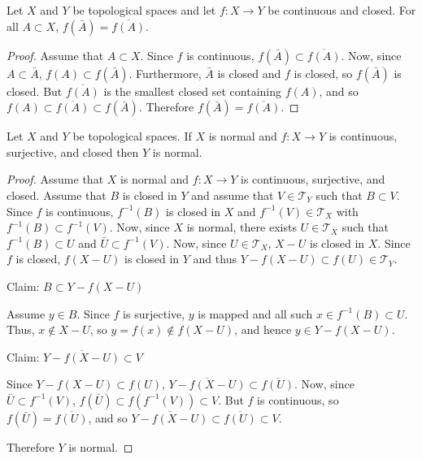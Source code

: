 \documentclass[letterpaper,12pt,fleqn]{article}
\newcommand{\T}{\mathscr{T}}
\begin{document}
\begin{lemma}
  Let \(X\) and \(Y\) be topological spaces and let \(f:X\to Y\) be continuous and closed.  For all \(A\subset X\),
  \(f(\bar{A})=\overline{f(A)}\).
\end{lemma}

\begin{proof}
  Assume that \(A\subset X\).  Since \(f\) is continuous, \(f(\bar{A})\subset\overline{f(A)}\).  Now, since
  \(A\subset\bar{A}\), \(f(A)\subset f(\bar{A})\).  Furthermore, \(\bar{A}\) is closed and \(f\) is closed, so
  \(f(\bar{A})\) is closed.  But \(\overline{f(A)}\) is the smallest closed set containing \(f(A)\), and so
  \(f(A)\subset\overline{f(A)}\subset f(\bar{A})\).  Therefore \(f(\bar{A})=\overline{f(A)}\).
\end{proof}

\begin{theorem}[7.21]
  Let \(X\) and \(Y\) be topological spaces.  If \(X\) is normal and \(f:X\to Y\) is continuous, surjective, and
  closed then \(Y\) is normal.
\end{theorem}

\begin{proof}
  Assume that \(X\) is normal and \(f:X\to Y\) is continuous, surjective, and closed.  Assume that \(B\) is closed
  in \(Y\) and assume that \(V\in\T_Y\) such that \(B\subset V\).  Since \(f\) is continuous, \(f^{-1}(B)\) is
  closed in \(X\) and \(f^{-1}(V)\in\T_X\) with \(f^{-1}(B)\subset f^{-1}(V)\).  Now, since \(X\) is normal, there
  exists \(U\in\T_X\) such that \(f^{-1}(B)\subset U\) and \(\bar{U}\subset f^{-1}(V)\).  Now, since \(U\in\T_X\),
  \(X-U\) is closed in \(X\).  Since \(f\) is closed, \(f(X-U)\) is closed in \(Y\) and thus
  \(Y-f(X-U)\subset f(U)\in\T_Y\).

  Claim: \(B\subset Y-f(X-U)\)

  Assume \(y\in B\).  Since \(f\) is surjective, \(y\) is mapped and all such \(x\in f^{-1}(B)\subset U\).  Thus,
  \(x\notin X-U\), so \(y=f(x)\notin f(X-U)\), and hence \(y\in Y-f(X-U)\).

  Claim: \(\overline{Y-f(X-U)}\subset V\)

  Since \(Y-f(X-U)\subset f(U)\), \(\overline{Y-f(X-U)}\subset\overline{f(U)}\).  Now, since
  \(\bar{U}\subset f^{-1}(V)\), \(f(\bar{U})\subset f(f^{-1}(V))\subset V\).  But \(f\) is continuous, so
  \(f(\bar{U})=\overline{f(U)}\), and so \(\overline{Y-f(X-U)}\subset\overline{f(U)}\subset V\).

  Therefore \(Y\) is normal.
\end{proof}
\end{document}
